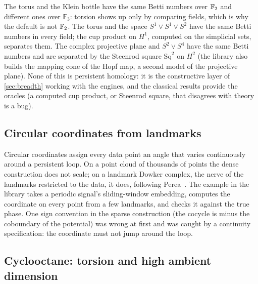 The torus and the Klein bottle have the same Betti numbers over $\mathbb{F}_2$ and different ones over $\mathbb{F}_3$: torsion shows up
only by comparing fields, which is why the default is not $\mathbb{F}_2$. The torus and the space $S^1\vee S^1\vee S^2$ have the same
Betti numbers in every field; the cup product on $H^1$, computed on the simplicial sets, separates them. The complex projective plane
and $S^2\vee S^4$ have the same Betti numbers and are separated by the Steenrod square $\mathrm{Sq}^2$ on $H^2$ (the library
also builds the mapping cone of the Hopf map, a second model of the projective plane). None of this is persistent homology: it is the
constructive layer of \cref{sec:breadth} working with the engines, and the classical results provide the oracles (a computed
cup product, or Steenrod square, that disagrees with theory is a bug).

\subsection{Circular coordinates from landmarks}\label{sec:circ}

Circular coordinates assign every data point an angle that varies continuously around a persistent loop. On a point cloud of
thousands of points the dense construction does not scale; on a landmark Dowker complex, the nerve of the landmarks restricted to
the data, it does, following Perea~\cite{perea2018multiscale}. The example in the library takes a periodic signal's
sliding-window embedding, computes the coordinate on every point from a few landmarks, and checks it against the true phase.
One sign convention in the sparse construction (the cocycle is minus the coboundary of the potential) was wrong at first and
was caught by a continuity specification: the coordinate must not jump around the loop.

\subsection{Cyclooctane: torsion and high ambient dimension}\label{sec:cyclooctane}

